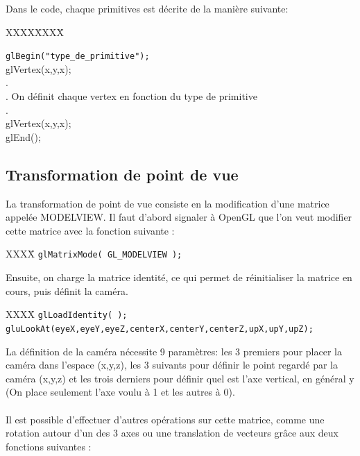 Dans le code, chaque primitives est décrite de la manière suivante:


\begin{tabbing}
XXXX\=XXXX\= \kill

\> \verb|glBegin("type_de_primitive");| \\
\> \> glVertex(x,y,x);\\
\> \> . \\
\> \> . On définit chaque vertex en fonction du type de primitive\\
\> \> . \\
\> \> glVertex(x,y,x);\\
\> glEnd();
\end{tabbing}

\subsection{Transformation de point de vue}
La transformation de point de vue consiste en la modification d'une matrice appelée MODELVIEW. Il faut d'abord signaler à OpenGL que l'on veut modifier cette matrice avec la fonction suivante :

\begin{tabbing}
XXXX\= \kill
\> \verb|glMatrixMode( GL_MODELVIEW );|
\end{tabbing}

Ensuite, on charge la matrice identité, ce qui permet de réinitialiser la matrice en cours, puis définit la caméra.

\begin{tabbing}
XXXX\= \kill
\> \verb|glLoadIdentity( );| \\
\> \verb|gluLookAt(eyeX,eyeY,eyeZ,centerX,centerY,centerZ,upX,upY,upZ);|
\end{tabbing}

La définition de la caméra nécessite 9 paramètres: les 3 premiers pour placer la caméra dans l'espace (x,y,z), les 3 suivants pour définir le point regardé par la caméra (x,y,z) et les trois derniers pour définir quel est l'axe vertical, en général y (On place seulement l'axe voulu à 1 et les autres à 0).\\\\

Il est possible d'effectuer d'autres opérations sur cette matrice, comme une rotation autour d'un des 3 axes ou une translation de vecteurs grâce aux deux fonctions suivantes :

